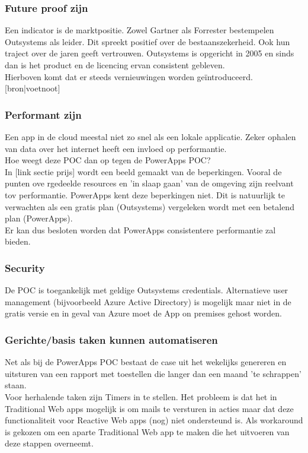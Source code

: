 \subsubsection{Future proof zijn}

Een indicator is de marktpositie. Zowel Gartner als Forrester bestempelen Outsystems als leider. Dit spreekt positief over de bestaanszekerheid.
Ook hun traject over de jaren geeft vertrouwen.
Outsystems is opgericht in 2005 en sinds dan is het product en de licencing ervan consistent gebleven.\\
Hierboven komt dat er steeds vernieuwingen worden geïntroduceerd. [bron|voetnoot]

\subsubsection{Performant zijn}

Een app in de cloud meestal niet zo snel als een lokale applicatie. Zeker ophalen van data over het internet heeft een invloed op performantie.\\
Hoe weegt deze POC dan op tegen de PowerApps POC?\\
In [link sectie prijs] wordt een beeld gemaakt van de beperkingen. Vooral de punten ove rgedeelde resources en 'in slaap gaan' van de omgeving zijn reelvant tov performantie. PowerApps kent deze beperkingen niet. Dit is natuurlijk te verwachten als een gratis plan (Outsystems) vergeleken wordt met een betalend plan (PowerApps).\\
Er kan dus besloten worden dat PowerApps consistentere performantie zal bieden.

\subsubsection{Security}

De POC is toegankelijk met geldige Outsystems credentials. Alternatieve user management (bijvoorbeeld Azure Active Directory) is mogelijk maar niet in de gratis versie en in geval van Azure moet de App on premises gehost worden.

\subsubsection{Gerichte/basis taken kunnen automatiseren}

Net als bij de PowerApps POC bestaat de case uit het wekelijks genereren en uitsturen van een rapport met toestellen die langer dan een maand 'te schrappen' staan.\\
Voor herhalende taken zijn Timers in te stellen. Het probleem is dat het in Traditional Web apps mogelijk is om mails te versturen in acties maar dat deze functionaliteit voor Reactive Web apps (nog) niet ondersteund is. Als workaround is gekozen om een aparte Traditional Web app te maken die het uitvoeren van deze stappen overneemt.

